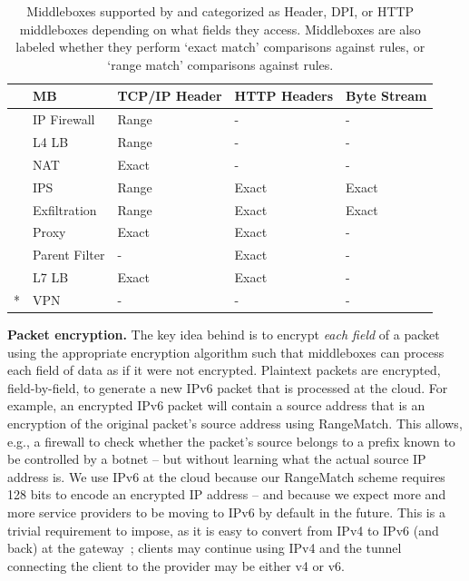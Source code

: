 \begin{table}
\centering
\small
\hspace{-2pt}
\begin{tabular}{l|l|p{.45in}|p{.45in}|p{.45in}}
&{\bf MB}&{\bf TCP/IP Header}&{\bf HTTP Headers}&{\bf Byte Stream}\\

\hline

\parbox[t]{1mm}{}
&IP Firewall&Range&-&-\\
&L4 LB&Range&-&-\\
&NAT&Exact&-&-\\
\hline


\parbox[t]{1mm}{}
&IPS&Range&Exact&Exact\\
&Exfiltration&Range&Exact&Exact\\
\hline

\parbox[t]{1mm}{}
&Proxy&Exact&Exact&-\\
&Parent Filter&-&Exact&-\\
&L7 LB&Exact&Exact&-\\
\hline
*&VPN&-&-&-\\

\end{tabular}
\caption[]{Middleboxes supported by \sys and categorized as Header, DPI, or HTTP middleboxes depending on what fields they access. Middleboxes are also labeled whether they perform `exact match' comparisons against rules, or `range match' comparisons against rules.\label{tbl:mbreqs}}

\end{table}



\noindent\textbf{Packet encryption.}
The key idea behind \sys is to encrypt {\it each field} of a packet using the appropriate encryption algorithm such that middleboxes can process each field of data as if it were not encrypted. 
Plaintext packets are encrypted, field-by-field, to generate a new IPv6 packet that is processed at the cloud.
For example, an encrypted IPv6 packet will contain a source address that is an encryption of the original packet's source address using RangeMatch. This allows, e.g., a firewall to check whether the packet's source belongs to a prefix known to be controlled by a botnet -- but without learning what the actual source IP address is.
We use IPv6 at the cloud because our RangeMatch scheme requires 128 bits to encode an encrypted IP address -- and because we expect more and more service providers to be moving to IPv6 by default in the future.
This is a trivial requirement to impose, as it is easy to convert from IPv4 to IPv6 (and back) at the gateway~\cite{siit}; clients may continue using IPv4 and the tunnel connecting the client to the provider may be either v4 or v6.

